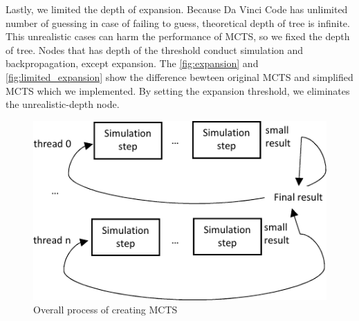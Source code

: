 Lastly, we limited the depth of expansion. 
Because Da Vinci Code has unlimited number of guessing in case of failing to guess, theoretical depth of tree is infinite.
This unrealistic cases can harm the performance of MCTS, so we fixed the depth of tree.
Nodes that has depth of the threshold conduct simulation and backpropagation, except expansion.
The \cref{fig:expansion} and \cref{fig:limited_expansion} show the difference bewteen original MCTS and simplified MCTS which we implemented.
By setting the expansion threshold, we eliminates the unrealistic-depth node.


\begin{figure}
\includegraphics[width=0.95\columnwidth]{figures/implementation.pdf}
\caption{Overall process of creating MCTS}
\label{fig:implementation}
\end{figure}

